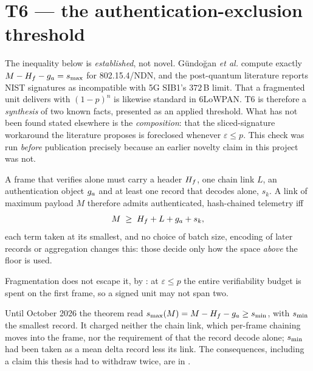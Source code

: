 \section{T6 --- the authentication-exclusion threshold}

\begin{remark}
The inequality below is \emph{established}, not novel. Gündoğan \emph{et al.} compute exactly
$M - H_f - g_a = s_{\max}$ for 802.15.4/NDN, and the post-quantum literature reports NIST signatures
as incompatible with 5G SIB1's $372$\,B limit. That a fragmented unit delivers with $(1-p)^n$ is
likewise standard in 6LoWPAN. T6 is therefore a \emph{synthesis} of two known facts, presented as
an applied threshold. What has not been found stated elsewhere is the \emph{composition}: that the
sliced-signature workaround the literature proposes is foreclosed whenever $\varepsilon \leq p$.
This check was run \emph{before} publication precisely because an earlier novelty claim in this
project was not.
\end{remark}

\begin{theorem}[Exclusion]\label{thm:t6}
A frame that verifies alone must carry a header $H_f$, one chain link $L$, an authentication
object $g_a$ and at least one record that decodes alone, $s_k$. A link of maximum payload $M$
therefore admits authenticated, hash-chained telemetry iff
\[
M \;\geq\; H_f + L + g_a + s_k ,
\]
each term taken at its smallest, and no choice of batch size, encoding of later records or
aggregation changes this: those decide only how the space \emph{above} the floor is used.
\end{theorem}

Fragmentation does not escape it, by : at $\varepsilon \leq p$ the entire
verifiability budget is spent on the first frame, so a signed unit may not span two.

\begin{remark}
Until October 2026 the theorem read $s_{\max}(M) = M - H_f - g_a \geq s_{\min}$, with $s_{\min}$ the
smallest record. It charged neither the chain link, which per-frame chaining moves into the frame,
nor the requirement of  that the record decode alone; $s_{\min}$ had been taken as
a mean delta record less its link. The consequences, including a claim this thesis had to
withdraw twice, are in .
\end{remark}

